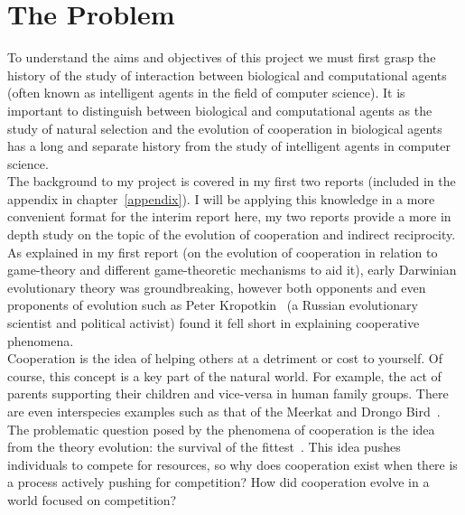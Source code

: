\documentclass[]{final_report}
\begin{document}
\section{The Problem}
\label{section:problem}
To understand the aims and objectives of this project we must first grasp the history of the study of interaction between biological and computational agents (often known as intelligent agents in the field of computer science). It is important to distinguish between biological and computational agents as the study of natural selection and the evolution of cooperation in biological agents has a long and separate history from the study of intelligent agents in computer science.\\
The background to my project is covered in my first two reports (included in the appendix in chapter~\ref{appendix}). I will be applying this knowledge in a more convenient format for the interim report here, my two reports provide a more in depth study on the topic of the evolution of cooperation and indirect reciprocity.\\
As explained in my first report (on the evolution of cooperation in relation to game-theory and different game-theoretic mechanisms to aid it), early Darwinian evolutionary theory was groundbreaking, however both opponents and even proponents of evolution such as Peter Kropotkin~\cite{kropotkin1902mutual} (a Russian evolutionary scientist and political activist) found it fell short in explaining cooperative phenomena.\\
Cooperation is the idea of helping others at a detriment or cost to yourself. Of course, this concept is a key part of the natural world. For example, the act of parents supporting their children and vice-versa in human family groups. There are even interspecies examples such as that of the Meerkat and Drongo Bird~\cite{bbcafrica}.\\
The problematic question posed by the phenomena of cooperation is the idea from the theory evolution: the survival of the fittest~\cite{spencer1864principles}. This idea pushes individuals to compete for resources, so why does cooperation exist when there is a process actively pushing for competition? How did cooperation evolve in a world focused on competition?
\end{document}
